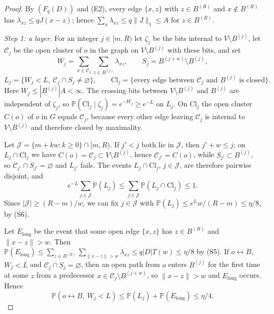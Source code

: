 \documentclass[11pt]{article}
\theoremstyle{definition}
\theoremstyle{remark}
\numberwithin{equation}{section}
\newcommand{\Pp}{\mathbb P}
\newcommand{\1}{\mathbf 1}
\newcommand{\cC}{\mathcal C}
\newcommand{\cJ}{\mathcal J}
\newcommand{\lr}{\leftrightarrow}
\newcommand{\norm}[1]{\|#1\|}
\begin{document}
\begin{proof}
By $(F_q(D))$ and (E2), every edge $\{x,z\}$ with $z\in B^{(R)}$ and $x\notin B^{(R)}$ has
$\lambda_{xz}\le qJ(x-z)$; hence $\sum_x\lambda_{xz}\le q\norm{J}_1\le A$ for $z\in B^{(R)}$.

\emph{Step 1: a layer.} For an integer $j\in[m,R)$ let $\zeta_j$ be the bits internal to
$V\setminus B^{(j)}$, let $\cC_j$ be the open cluster of $o$ in the graph on $V\setminus B^{(j)}$ with
these bits, and set
\[
W_j=\sum_{x\in\cC_j}\sum_{z\in B^{(j)}}\lambda_{xz},\qquad S_j=B^{(j+w)}\setminus B^{(j)},
\]
\[
L_j=\{W_j<L,\ \cC_j\cap S_j\ne\varnothing\},\qquad
\mathrm{Cl}_j=\{\text{every edge between }\cC_j\text{ and }B^{(j)}\text{ is closed}\}.
\]
Here $W_j\le|B^{(j)}|A<\infty$. The crossing bits between $V\setminus B^{(j)}$ and $B^{(j)}$ are
independent of $\zeta_j$, so $\Pp(\mathrm{Cl}_j\mid\zeta_j)=e^{-W_j}\ge e^{-L}$ on $L_j$. On
$\mathrm{Cl}_j$ the open cluster $C(o)$ of $o$ in $G$ equals $\cC_j$, because every other edge
leaving $\cC_j$ is internal to $V\setminus B^{(j)}$ and therefore closed by maximality.

Let $\cJ=\{m+kw:k\ge0\}\cap[m,R)$. If $j'<j$ both lie in $\cJ$, then $j'+w\le j$; on
$L_j\cap\mathrm{Cl}_j$ we have $C(o)=\cC_j\subset V\setminus B^{(j)}$, hence $\cC_{j'}=C(o)$, while
$S_{j'}\subset B^{(j)}$, so $\cC_{j'}\cap S_{j'}=\varnothing$ and $L_{j'}$ fails. The events
$L_j\cap\mathrm{Cl}_j$, $j\in\cJ$, are therefore pairwise disjoint, and
\[
e^{-L}\sum_{j\in\cJ}\Pp(L_j)\le\sum_{j\in\cJ}\Pp(L_j\cap\mathrm{Cl}_j)\le1.
\]
Since $|\cJ|\ge(R-m)/w$, we can fix $j\in\cJ$ with $\Pp(L_j)\le e^Lw/(R-m)\le\eta/8$, by (S6).

Let $E_{\mathrm{long}}$ be the event that some open edge $\{x,z\}$ has $z\in B^{(R)}$ and
$\norm{x-z}>w$. Then
$\Pp(E_{\mathrm{long}})\le\sum_{z\in B^{(R)}}\sum_{\norm{x-z}>w}\lambda_{xz}\le q|D|T(w)\le\eta/8$
by (S5). If $o\lr B$, $W_j<L$ and $\cC_j\cap S_j=\varnothing$, then an open path from $o$ enters
$B^{(j)}$ for the first time at some $z$ from a predecessor $x\in\cC_j\setminus B^{(j+w)}$, so
$\norm{x-z}>w$ and $E_{\mathrm{long}}$ occurs. Hence
\begin{equation}\label{eq:low-weight}
\Pp(o\lr B,\ W_j<L)\le\Pp(L_j)+\Pp(E_{\mathrm{long}})\le\eta/4.
\end{equation}


\end{proof}
\end{document}
